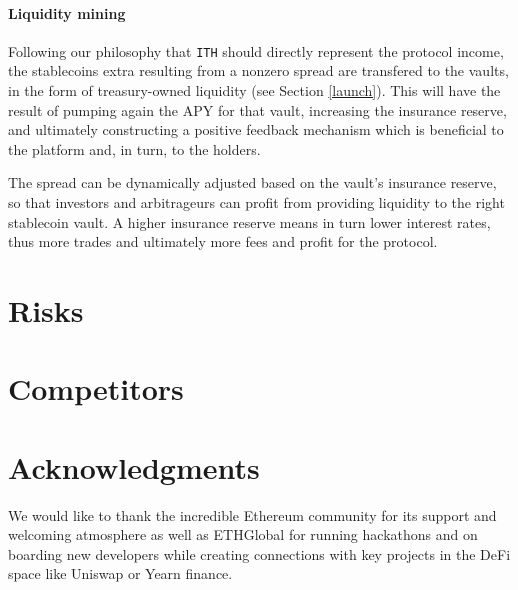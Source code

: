 \documentclass[a4paper,10 pt]{article}
\theoremstyle{definition}
\begin{document}
\paragraph{Liquidity mining}
Following our philosophy that \verb|ITH| should directly represent the protocol income, the stablecoins extra resulting from a nonzero spread are transfered to the vaults, in the form of treasury-owned liquidity (see Section \ref{launch}). This will have the result of pumping again the APY for that vault, increasing the insurance reserve, and ultimately constructing a positive feedback mechanism which is beneficial to the platform and, in turn, to the holders.

The spread can be dynamically adjusted based on the vault's insurance reserve, so that investors and arbitrageurs can profit from providing liquidity to the right stablecoin vault. A higher insurance reserve means in turn lower interest rates, thus more trades and ultimately more fees and profit for the protocol.

\section{Risks}

\section{Competitors}

\section{Acknowledgments}

We would like to thank the incredible Ethereum community for its support and welcoming atmosphere as well as ETHGlobal for running hackathons and on boarding new developers while creating connections with key projects in the DeFi space like Uniswap or Yearn finance.
\end{document}
